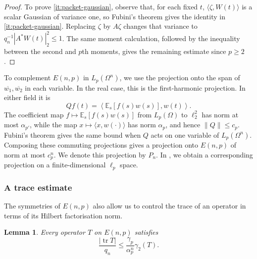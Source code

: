 \documentclass[11pt,a4paper,reqno]{amsart}
\newtheorem{lemma}[lemma]{Lemma}
\theoremstyle{definition}
\newcommand{\norm}[1]{\lVert #1\rVert}
\DeclareMathOperator{\tr}{tr}
\numberwithin{equation}{section}
\begin{document}
\begin{proof}
To prove \ref{it:packet-gaussian}, observe that, for each fixed $t$, $\langle \zeta,W(t)\rangle$ is a scalar Gaussian of variance one, so Fubini's theorem gives the identity in \ref{it:packet-gaussian}. Replacing $\zeta$ by $A\zeta$ changes that variance to $q_n^{-1}|A^*W(t)|_2^2\leq1$. The same moment calculation, followed by the inequality between the second and $p$th moments, gives the remaining estimate since $p\geq2$.
\end{proof}

To complement $E(n,p)$ in $L_p(\Omega^n)$, we use the projection onto the span of $\overline{w_1},\overline{w_2}$ in each variable. In the real case, this is the first-harmonic projection. In either field it is
\begin{equation*}
 Qf(t)=\left\langle\mathbb E_s[f(s)w(s)],w(t)\right\rangle.
\end{equation*}
The coefficient map $f\mapsto\mathbb E_s[f(s)w(s)]$ from $L_p(\Omega)$ to $\ell_2^2$ has norm at most $\alpha_{p'}$, while the map $x\mapsto\langle x,w(\cdot)\rangle$ has norm $\alpha_p$, and hence $\norm Q\leq c_p$. Fubini's theorem gives the same bound when $Q$ acts on one variable of $L_p(\Omega^n)$. Composing these commuting projections gives a projection onto $E(n,p)$ of norm at most $c_p^n$. We denote this projection by $P_n$. In , we obtain a corresponding projection on a finite-dimensional $\ell_p$ space.

\subsubsection*{A trace estimate}
The symmetries of $E(n,p)$ also allow us to control the trace of an operator in terms of its Hilbert factorisation norm.

\begin{lemma}\label{lem:trace-estimate}
Every operator $T$ on $E(n,p)$ satisfies
\begin{equation}\label{eq:trace-estimate}
 \frac{|\tr T|}{q_n}\leq\frac{\gamma_p}{\alpha_p^n}\gamma_2(T).
\end{equation}
\end{lemma}
\end{document}
